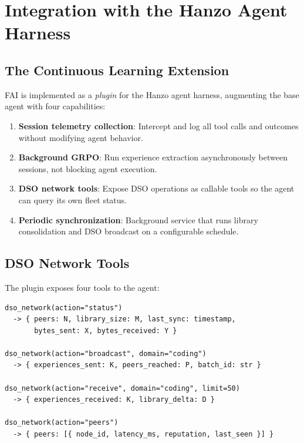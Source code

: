 \section{Integration with the Hanzo Agent Harness}

\label{sec:harness}

\subsection{The Continuous Learning Extension}

FAI is implemented as a \emph{plugin} for the Hanzo agent harness,
augmenting the base agent with four capabilities:
\begin{enumerate}[leftmargin=1.5em]
    \item \textbf{Session telemetry collection}: Intercept and log all tool
          calls and outcomes without modifying agent behavior.
    \item \textbf{Background GRPO}: Run experience extraction asynchronously
          between sessions, not blocking agent execution.
    \item \textbf{DSO network tools}: Expose DSO operations as callable tools
          so the agent can query its own fleet status.
    \item \textbf{Periodic synchronization}: Background service that runs
          library consolidation and DSO broadcast on a configurable schedule.
\end{enumerate}

\subsection{DSO Network Tools}

The plugin exposes four tools to the agent:

\begin{verbatim}
dso_network(action="status")
  -> { peers: N, library_size: M, last_sync: timestamp,
       bytes_sent: X, bytes_received: Y }

dso_network(action="broadcast", domain="coding")
  -> { experiences_sent: K, peers_reached: P, batch_id: str }

dso_network(action="receive", domain="coding", limit=50)
  -> { experiences_received: K, library_delta: D }

dso_network(action="peers")
  -> { peers: [{ node_id, latency_ms, reputation, last_seen }] }
\end{verbatim}

